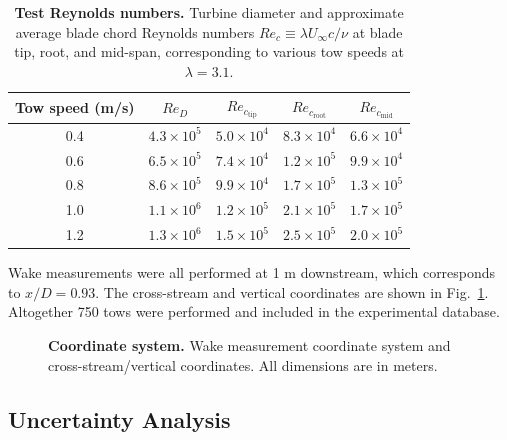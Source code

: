 \documentclass[10pt,letterpaper]{article}
\begin{document}
\begin{table}
\centering
\begin{tabular}{c|c|c|c|c}
Tow speed (m/s) & $Re_D$ & $Re_{c_\mathrm{tip}}$ & $Re_{c_\mathrm{root}}$ & $Re_{c_\mathrm{mid}}$\\
\hline
0.4 & $4.3 \times 10^5$ & $5.0 \times 10^4$ & $8.3 \times 10^4$ & $6.6 \times 10^4$ \\
0.6 & $6.5 \times 10^5$ & $7.4 \times 10^4$ & $1.2 \times 10^5$ & $9.9 \times 10^4$ \\
0.8 & $8.6 \times 10^5$ & $9.9 \times 10^4$ & $1.7 \times 10^5$ & $1.3 \times 10^5$ \\
1.0 & $1.1 \times 10^6$ & $1.2 \times 10^5$ & $2.1 \times 10^5$ & $1.7 \times 10^5$ \\
1.2 & $1.3 \times 10^6$ & $1.5 \times 10^5$ & $2.5 \times 10^5$ & $2.0 \times 10^5$ \\
\end{tabular}

\caption{{\bf Test Reynolds numbers.} Turbine diameter and approximate average
blade chord Reynolds numbers $Re_c \equiv \lambda U_\infty c / \nu$ at blade
tip, root, and mid-span, corresponding to various tow speeds at $\lambda=3.1$.}

\label{tab:re}
\end{table}

Wake measurements were all performed at 1 m downstream, which corresponds to
$x/D = 0.93$. The cross-stream and vertical coordinates are shown in
Fig.~\ref{fig:coordinates}. Altogether 750 tows were performed and included in
the experimental database.

\begin{figure}

    \caption{{\bf Coordinate system.} Wake measurement coordinate system and
    cross-stream/vertical coordinates. All dimensions are in meters.}

    \label{fig:coordinates}
\end{figure}


\subsection*{Uncertainty Analysis}
\end{document}

